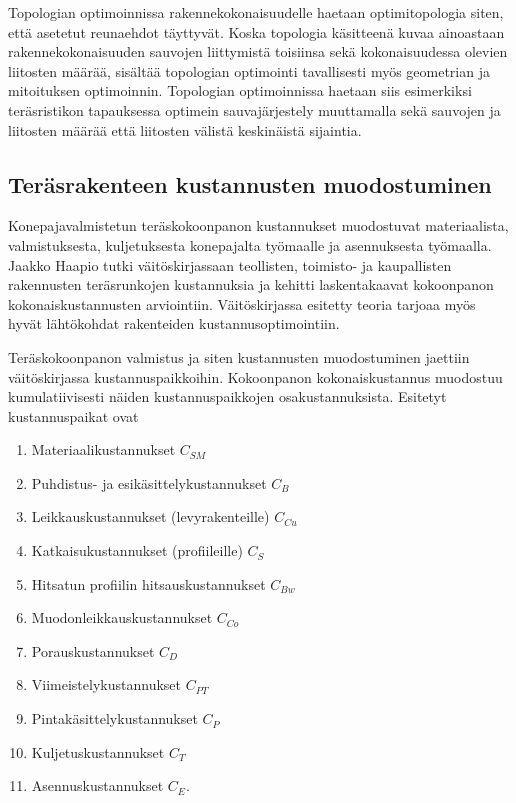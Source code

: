 \documentclass[12pt]{article}
\newenvironment{content}{\pagenumbering{arabic}}{}
\begin{document}
\begin{content}
Topologian optimoinnissa rakennekokonaisuudelle haetaan optimitopologia siten, että asetetut reunaehdot täyttyvät. Koska topologia käsitteenä kuvaa ainoastaan rakennekokonaisuuden sauvojen liittymistä toisiinsa sekä kokonaisuudessa olevien liitosten määrää, sisältää topologian optimointi tavallisesti myös geometrian ja mitoituksen optimoinnin. Topologian optimoinnissa haetaan siis esimerkiksi teräsristikon tapauksessa optimein sauvajärjestely muuttamalla sekä sauvojen ja liitosten määrää että liitosten välistä keskinäistä sijaintia. 

\subsection{Teräsrakenteen kustannusten muodostuminen}

Konepajavalmistetun teräskokoonpanon kustannukset muodostuvat materiaalista, valmistuksesta, kuljetuksesta konepajalta työmaalle ja asennuksesta työmaalla. Jaakko Haapio tutki väitöskirjassaan \parencite{haapio_doct} teollisten, toimisto- ja kaupallisten rakennusten teräsrunkojen kustannuksia ja kehitti laskentakaavat kokoonpanon kokonaiskustannusten arviointiin. Väitöskirjassa esitetty teoria tarjoaa myös hyvät lähtökohdat rakenteiden kustannusoptimointiin.

Teräskokoonpanon valmistus ja siten kustannusten muodostuminen jaettiin väitöskirjassa kustannuspaikkoihin. Kokoonpanon kokonaiskustannus muodostuu kumulatiivisesti näiden kustannuspaikkojen osakustannuksista. Esitetyt kustannuspaikat ovat

\begin{enumerate}
\item Materiaalikustannukset $C_{SM}$
\item Puhdistus- ja esikäsittelykustannukset $C_B$
\item Leikkauskustannukset (levyrakenteille) $C_{Cu}$
\item Katkaisukustannukset (profiileille) $C_S$
\item Hitsatun profiilin hitsauskustannukset $C_{Bw}$
\item Muodonleikkauskustannukset $C_{Co}$
\item Porauskustannukset $C_D$
\item Viimeistelykustannukset $C_{PT}$
\item Pintakäsittelykustannukset $C_P$
\item Kuljetuskustannukset $C_T$
\item Asennuskustannukset $C_E$.
\end{enumerate}


\end{content}
\end{document}
